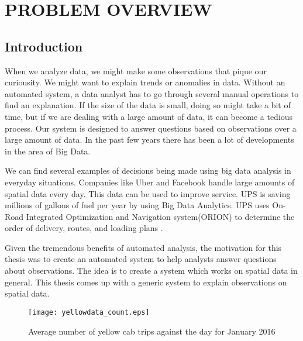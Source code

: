 \chapter{PROBLEM OVERVIEW}


\label{sec:Intro}
\section{Introduction}

When we analyze data, we might make some observations that pique our curiousity. We might want to explain trends or anomalies in data. Without an automated system, a data analyst has to go through several manual operations to find an explanation. If the size of the data is small, doing so might take a bit of time, but if we are dealing with a large amount of data, it can become a tedious process. Our system is designed to answer questions based on observations over a large amount of data. In the past few years there has been a lot of developments in the area of Big Data.

We can find several examples of decisions being made using big data analysis in everyday situations. Companies like Uber and Facebook handle large amounts of spatial data every day. This data can be used to improve service. UPS is saving millions of gallons of fuel per year by using Big Data Analytics. UPS uses On-Road Integrated Optimization and Navigation system(ORION) to determine the order of delivery, routes, and loading plans \citep{upsarticle}.

Given the tremendous benefits of automated analysis, the motivation for this thesis was to create an automated system to help analysts answer questions about observations. The idea is to create a system which works on spatial data in general. This thesis comes up with a generic system to explain observations on spatial data.


\begin{figure}[ht]
\texttt{[image: yellowdata\_count.eps]}
\caption{Average number of yellow cab trips against the day for January 2016}
\label{fig:yellowstats}
\end{figure}

